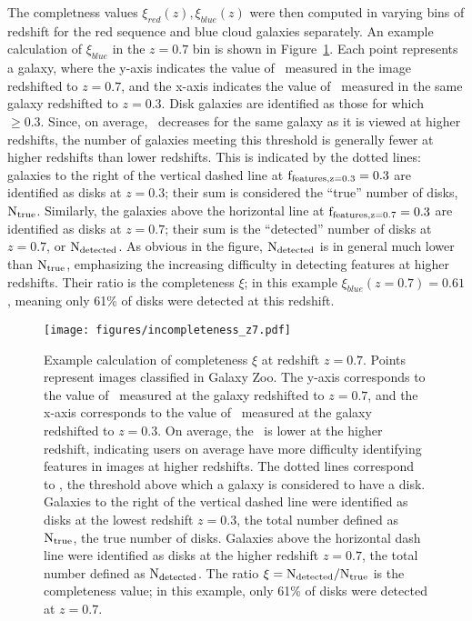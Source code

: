 The completness values $\xi_{red}(z),\xi_{blue}(z)$ were then computed in varying bins of redshift for the red sequence and blue cloud galaxies separately. An example calculation of $\xi_{blue}$ in the $z=0.7$ bin is shown in Figure~\ref{fig:inc_subplot}. Each point represents a  galaxy, where the y-axis indicates the value of \ffeatures~measured in the image redshifted to $z=0.7$, and the x-axis indicates the value of \ffeatures~measured in the same galaxy redshifted to $z=0.3$. Disk galaxies are identified as those for which \ffeatures~$\ge0.3$. Since, on average, \ffeatures~decreases for the same galaxy as it is viewed at higher redshifts, the number of galaxies meeting this threshold is generally fewer at higher redshifts than lower redshifts. This is indicated by the dotted lines: galaxies to the right of the vertical dashed line at $\rm f_{features,z=0.3}=0.3$ are identified as disks at $z=0.3$; their sum is considered the ``true'' number of disks, $\rm N_{true}$. Similarly, the galaxies above the horizontal line at $\rm f_{features,z=0.7}=0.3$ are identified as disks at $z=0.7$; their sum is the ``detected'' number of disks at $z=0.7$, or $\rm N_{detected}$. As obvious in the figure, $\rm N_{detected}$ is in general much lower than $\rm N_{true}$, emphasizing the increasing difficulty in detecting features at higher redshifts. Their ratio is the completeness $\xi$; in this example $\xi_{blue}(z=0.7)=0.61$, meaning only 61\% of disks were detected at this redshift. 

\begin{figure}
\centering
\texttt{[image: figures/incompleteness\_z7.pdf]}
\caption{Example calculation of completeness $\xi$ at redshift $z=0.7$. Points represent  images classified in Galaxy Zoo. The y-axis corresponds to the value of \ffeatures~measured at the galaxy redshifted to $z=0.7$, and the x-axis corresponds to the value of \ffeatures~measured at the galaxy redshifted to $z=0.3$. On average, the \ffeatures~is lower at the higher redshift, indicating users on average have more difficulty identifying features in images at higher redshifts. The dotted lines correspond to , the threshold above which a galaxy is considered to have a disk. Galaxies to the right of the vertical dashed line were identified as disks at the lowest redshift $z=0.3$, the total number defined as $\rm N_{true}$, the true number of disks. Galaxies above the horizontal dash line were identified as disks at the higher redshift $z=0.7$, the total number defined as $\rm N_{detected}$. The ratio $\rm \xi=N_{detected}/N_{true}$ is the completeness value; in this example, only 61\% of disks were detected at $z=0.7$.}
\label{fig:inc_subplot}
\end{figure}

